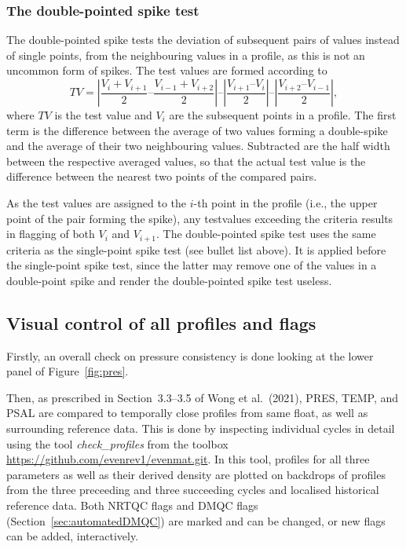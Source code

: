 \documentclass{article}
\begin{document}
\subsubsection{The double-pointed spike test}\label{sec:double-pointed-spike-test}
The double-pointed spike tests the deviation of subsequent pairs of values
instead of single points, from the neighbouring values in a profile, as
this is not an uncommon form of spikes. The test values are formed
according to 
\begin{equation}
  \label{eq:1}
  TV = \left|\frac{V_{i} + V_{i+1}}{2} – \frac{V_{i-1} + V_{i+2}}{2}\right| – \left|\frac{V_{i+1} – V_{i}}{2}\right|  – \left|\frac{V_{i+2} – V_{i-1}}{2}\right| ,
\end{equation}
where $TV$ is the test value and $V_i$ are the subsequent points in a
profile.
%
The first term is the difference between the average of two values forming
a double-spike and the average of their two neighbouring values.
Subtracted are the half width between the respective averaged values, so
that the actual test value is the difference between the nearest two points
of the compared pairs.

As the test values are assigned to the $i$-th
point in the profile (i.e., the upper point of the pair forming the
spike), any testvalues exceeding the criteria results in flagging of both
$V_i$ and $V_{i+1}$.
%
The double-pointed spike test uses the same criteria as the single-point
spike test (see bullet list above).
It is applied before the single-point spike test, since the latter may remove
one of the values in a double-point spike and render the double-pointed spike
test useless.


\subsection{Visual control of all profiles and flags}\label{sec:visualDMQC}
Firstly, an overall check on pressure consistency is done looking at the
lower panel of Figure~\ref{fig:pres}.

Then, as prescribed in Section~3.3--3.5 of Wong et al.~(2021), PRES, TEMP,
and PSAL are compared to temporally close profiles from same float, as
well as surrounding reference data. This is done by inspecting individual
cycles in detail using the tool \emph{check\_profiles} from the toolbox
\href{url}{https://github.com/evenrev1/evenmat.git}.
%
In this tool, profiles for all three parameters as well as their derived
density are plotted on backdrops of profiles from the three preceeding and
three succeeding cycles and localised historical reference data.  Both
NRTQC flags and DMQC flags (Section~\ref{sec:automatedDMQC}) are marked
and can be changed, or new flags can be added, interactively.
%
\end{document}
